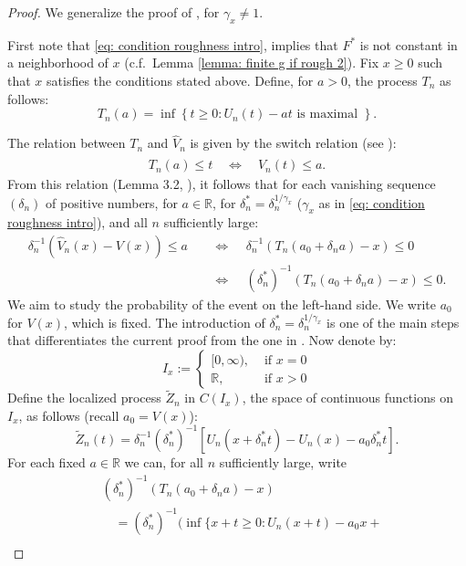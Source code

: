 \begin{proof}
We generalize the proof of \cite{1}, for $\gamma_x\neq 1$.

First note that \eqref{eq: condition roughness intro}, implies that $F^*$ is not constant in a neighborhood of $x$ (c.f.\ Lemma \ref{lemma: finite g if rough 2}). 
Fix $x \geq 0$ such that $x$ satisfies the conditions stated above. Define, for $a>0$, the process $T_n$ as follows:
$$
T_n(a)=\inf \left\{t \geq 0: U_n(t)-a t \text { is maximal }\right\}.
$$


The relation between $T_n$ and $\hat{V}_n$ is given by the switch relation (see \cite{2}):
\begin{align}\label{eq: switch relation}
T_n(a) \leq t \quad \Leftrightarrow \quad \hat{V}_n(t) \leq a .
\end{align}
From this relation (Lemma 3.2, \cite{2}), it follows that for each vanishing sequence $\left(\delta_n\right)$ of positive numbers, for $a\in \mathbb{R}$, for $\delta^*_n = \delta_n^{1/\gamma_x}$ ($\gamma_x$ as in \eqref{eq: condition roughness intro}), and all $n$ sufficiently large:
\begin{align*}
\delta_n^{-1}\left(\hat{V}_n(x)-V(x)\right) \leq a \: \: \: \: \: &\Leftrightarrow \: \: \: \: \: \delta_n^{-1}\left(T_n\left(a_0+\delta_n a\right)-x\right) \leq 0 \: \: \: \: \: \\
&\Leftrightarrow \: \: \: \: \: (\delta^*_n)^{-1}\left(T_n\left(a_0+\delta_n a\right)-x\right) \leq 0. 
\end{align*}
We aim to study the probability of the event on the left-hand side. We write $a_0$ for $V(x)$, which is fixed. The introduction of $\delta^*_n = \delta_n^{1/\gamma_x}$ is one of the main steps that differentiates the current proof from the one in \cite{1}. Now denote by:
$$
I_x := \begin{cases}{[0, \infty),} & \text { if } x=0 \\ \mathbb{R}, & \text { if } x>0\end{cases}
$$
\color{black} Define the localized process $\tilde{Z}_n$ in $C\left(I_x\right)$, the space of continuous functions on $I_x$, as follows (recall $a_0 = V(x)$):
$$
\tilde{Z}_n(t)=\delta_n^{-1} (\delta^*_n)^{-1} \left[U_n\left(x+\delta^*_n t\right)-U_n(x)-a_0 \delta^*_n t\right] .
$$
For each fixed $a \in \mathbb{R}$ we can, for all $n$ sufficiently large, write 
$$
\begin{aligned}
& (\delta^*_n)^{-1}\left(T_n\left(a_0+\delta_n a\right)-x\right) \\
&\quad = (\delta^*_n)^{-1} \big(\operatorname { i n f } \big\{x+t \geq 0: U_n(x+t)-a_0 x +\\

\end{aligned}$$
\end{proof}
